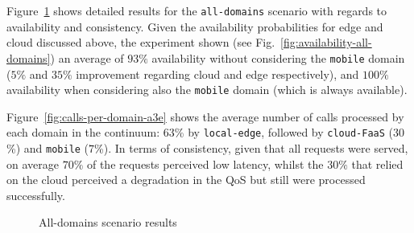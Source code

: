 
Figure~\ref{fig:all-domains} shows detailed results for the \texttt{all-domains} scenario with regards to availability and consistency. Given the availability probabilities for edge and cloud discussed above, the experiment shown (see Fig.~\ref{fig:availability-all-domains}) an average of $93\%$ availability without considering the \texttt{mobile} domain ($5\%$ and $35\%$ improvement regarding cloud and edge respectively), and $100\%$ availability when considering also the \texttt{mobile} domain (which is always available). 

Figure~\ref{fig:calls-per-domain-a3e} shows the average number of calls processed by each domain in the continuum: $63$\% by \texttt{local-edge}, followed by \texttt{cloud-FaaS} ($30$\%) and \texttt{mobile} ($7$\%). In terms of consistency, given that all requests were served, on average $70\%$ of the requests perceived low latency, whilst the $30\%$ that relied on the cloud perceived a degradation in the QoS but still were processed successfully. 
 
\begin{figure}[htb]
	\centering

	\captionsetup[subfigure]{width=0.45\textwidth}
	\captionsetup[subfigure]{width=0.45\textwidth}
	
	\caption{All-domains scenario results} \label{fig:all-domains}
\end{figure}

